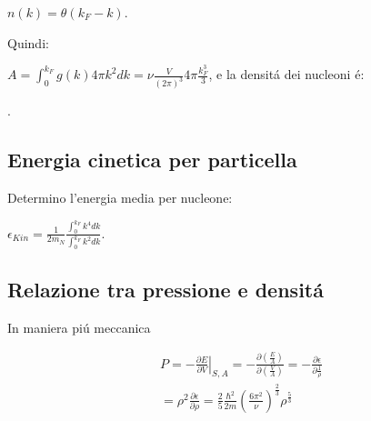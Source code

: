  $n(k)=\theta (k_F-k)$. 
 
 Quindi:
 
 $A=\int_0^{k_F}g(k)4\pi k^2dk=\nu \frac{V}{(2\pi)^3}4\pi \frac{k_F^3}{3}$, e la densit\'a dei nucleoni \'e:
 
.



\subsection{Energia cinetica per particella}
Determino l'energia media per nucleone:

$\epsilon_{Kin}=\frac{1}{2m_N}\frac{\int_0^{k_F}k^4dk}{\int_0^{k_F}k^2dk}$.


\subsection{Relazione tra pressione e densit\'a}


In maniera pi\'u meccanica 

\begin{align*}
&P=-\left.\frac{\partial E}{\partial V} \right|_{S,A}=-\frac{\partial (\frac{E}{A})}{\partial (\frac{V}{A})}=-\frac{\partial \epsilon}{\partial \frac{1}{\rho}}\\
&=\rho^2 \frac{\partial \epsilon}{\partial \rho}=\frac{2}{5}\frac{\hbar^2}{2m}(\frac{6\pi^2}{\nu})^{\frac{2}{3}}\rho^\frac{5}{3}
\end{align*}


